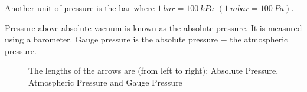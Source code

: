 \documentclass{article}
\begin{document}
    Another unit of pressure is the \si{bar} where \(\SI{1}{bar} = \SI{100}{kPa}\) \((\SI{1}{mbar} = \SI{100}{Pa})\).
    
    Pressure above absolute vacuum is known as the absolute pressure. It is measured using a barometer.
    Gauge pressure is the absolute pressure \(-\) the atmospheric pressure.
    \begin{figure}[ht]
        \centering
        \caption{The lengths of the arrows are (from left to right): Absolute Pressure, Atmospheric Pressure and Gauge Pressure}
    \end{figure}
    
\end{document}
